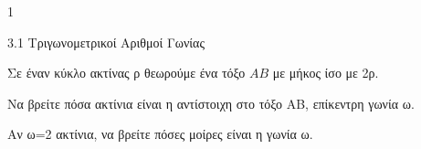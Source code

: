 \begin{ylh}{1}
\item 3.1 Τριγωνομετρικοί Αριθμοί Γωνίας
\end{ylh}
Σε έναν κύκλο ακτίνας ρ θεωρούμε ένα τόξο $AB$ με μήκος ίσο με 2ρ.
\begin{alist}
\item Να βρείτε πόσα ακτίνια είναι η αντίστοιχη στο τόξο ΑΒ, επίκεντρη γωνία ω.
\item Αν ω=2 ακτίνια, να βρείτε πόσες μοίρες είναι η γωνία ω.
\end{alist}

